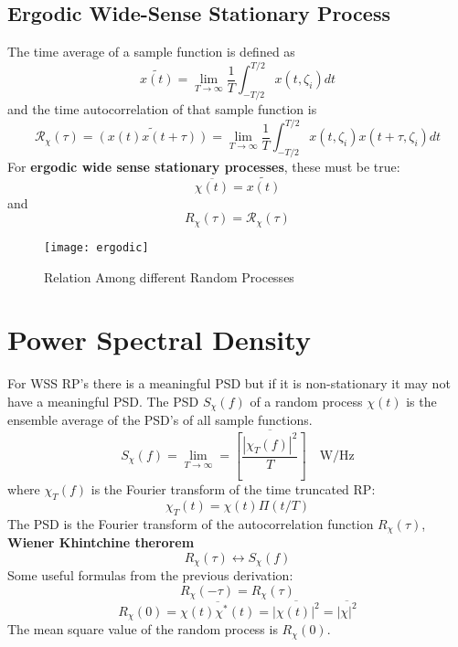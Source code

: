 \documentclass{article}
\begin{document}
    \subsection{Ergodic Wide-Sense Stationary Process}
    The time average of a sample function is defined as
    \begin{equation}
        \widetilde{x(t)} = \lim_{T \rightarrow \infty}\frac{1}{T}\int_{-T/2}^{T/2}x(t, \zeta_i)dt
    \end{equation}
    and the time autocorrelation of that sample function is 
    \begin{equation}
        \mathcal{R_\chi(\tau)} = \widetilde{(x(t)x(t+\tau))} = 
            \lim_{T \rightarrow \infty}\frac{1}{T}\int_{-T/2}^{T/2}x(t, \zeta_i)x(t+\tau, \zeta_i)dt
    \end{equation}
    For \textbf{ergodic wide sense stationary processes}, these must be true:
    \begin{equation}
        \overline{\chi(t)} = \widetilde{x(t)}
    \end{equation}
    and 
    \begin{equation}
        R_\chi(\tau) = \mathcal{R}_\chi(\tau)
    \end{equation}

    \begin{figure}[h]
        \centering
        \texttt{[image: ergodic]}
        \caption{Relation Among different Random Processes}
    \end{figure}

    \section{Power Spectral Density}
    For WSS RP's there is a meaningful PSD but if it is non-stationary it may not have a meaningful PSD. The PSD $S_\chi(f)$ 
    of a random process $\chi(t)$ is the ensemble average of the PSD's of all sample functions.
    \begin{equation}
        S_\chi(f) = \lim_{T\rightarrow\infty} = \overline{ \left[ \frac{|\chi_T(f)|^2}{T} \right]} \quad \textrm{W/Hz}
    \end{equation}
    where $\chi_T(f)$ is the Fourier transform of the time truncated RP:
    \begin{equation}
        \chi_T(t) = \chi(t) \Pi(t/T)
    \end{equation}
    The PSD is the Fourier transform of the autocorrelation function $R_\chi(\tau)$, \textbf{Wiener Khintchine therorem}
    \begin{equation}
        R_\chi(\tau) \leftrightarrow S_\chi(f)
    \end{equation}
    Some useful formulas from the previous derivation:
    \begin{equation}
        R_\chi(-\tau) = R_\chi(\tau)
    \end{equation}
    \begin{equation}
        R_\chi(0) = \overline{\chi(t)\chi^*(t)} = \overline{|\chi(t)|^2} = \overline{|\chi|^2}
    \end{equation}
    The mean square value of the random process is $R_\chi(0)$.
\end{document}

